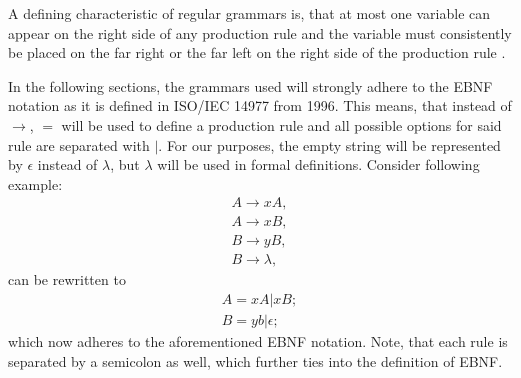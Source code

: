 \documentclass[runningheads]{llncs}
\begin{document}
A defining characteristic of regular grammars is, that at most one variable can appear on the right side of any production rule and the variable must consistently be placed on the far right or the far left on the right side of the production rule \cite[92]{fla-2017}.

In the following sections, the grammars used will strongly adhere to the EBNF notation as it is defined in ISO/IEC 14977 from 1996. This means, that instead of $\rightarrow$, $=$ will be used to define a production rule and all possible options for said rule are separated with $|$. For our purposes, the empty string will be represented by $\epsilon$ instead of $\lambda$, but $\lambda$ will be used in formal definitions. Consider following example:
\begin{align}
A \rightarrow xA,\\
A \rightarrow xB,\\
B \rightarrow yB,\\
B \rightarrow \lambda,
\end{align}
can be rewritten to
\begin{align}
A = xA|xB;\\
B = yb|\epsilon;
\end{align}
which now adheres to the aforementioned EBNF notation. Note, that each rule is separated by a semicolon as well, which further ties into the definition of EBNF.
\end{document}
